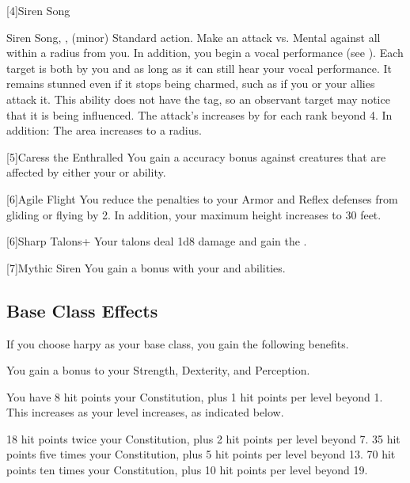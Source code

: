     [4]{Siren Song}
      \begin{magicalsustainability}{Siren Song}{, ,  (minor)}
        \abilityusagetime Standard action.
        \rankline
        Make an attack vs. Mental against all  within a \medarea radius from you.
        In addition, you begin a vocal performance (see ).
        \hit Each target is both \charmed by you and \stunned as long as it can still hear your vocal performance.
        It remains stunned even if it stops being charmed, such as if you or your allies attack it.
        This ability does not have the  tag, so an observant target may notice that it is being influenced.
        \rankline
        The attack's  increases by  for each rank beyond 4.
        In addition:
         The area increases to a \largearea radius.
      \end{magicalsustainability}

    [5]{Caress the Enthralled} You gain a  accuracy bonus against creatures that are affected by either your  or  ability.

    [6]{Agile Flight} You reduce the penalties to your Armor and Reflex defenses from gliding or flying by 2.
      In addition, your maximum height increases to 30 feet.

    [6]{Sharp Talons+} Your talons deal 1d8 damage and gain the  .

    [7]{Mythic Siren} You gain a   bonus with your  and  abilities.

  \subsection{Base Class Effects}
    If you choose harpy as your base class, you gain the following benefits.

     You gain a  bonus to your Strength, Dexterity, and Perception.

      You have 8 hit points \add  your Constitution, plus 1 hit points per level beyond 1.
      This increases as your level increases, as indicated below.
      \begin{itemize}
         18 hit points \add twice your Constitution, plus 2 hit points per level beyond 7.
         35 hit points \add five times your Constitution, plus 5 hit points per level beyond 13.
         70 hit points \add ten times your Constitution, plus 10 hit points per level beyond 19.
      \end{itemize}

